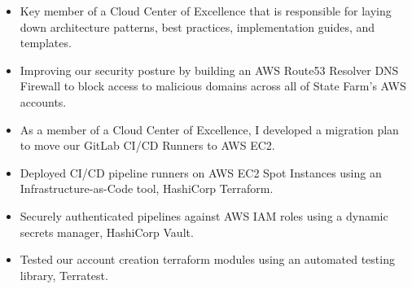\documentclass[10pt,a4paper,ragged2e,withhyper]{altacv}
\begin{document}

\makecvheader

\medskip


\begin{paracol}{2}



\medskip



\begin{itemize}
\item Key member of a Cloud Center of Excellence that is responsible for laying down architecture patterns, best practices, implementation guides, and templates.
\item Improving our security posture by building an AWS Route53 Resolver DNS Firewall to block access to malicious domains across all of State Farm's AWS accounts.
\end{itemize}

\divider


\begin{itemize}
\item As a member of a Cloud Center of Excellence, I developed a migration plan to move our GitLab CI/CD Runners to AWS EC2.
\item Deployed CI/CD pipeline runners on AWS EC2 Spot Instances using an Infrastructure-as-Code tool, HashiCorp Terraform.
\item Securely authenticated pipelines against AWS IAM roles using a dynamic secrets manager, HashiCorp Vault.
\item Tested our account creation terraform modules using an automated testing library, Terratest.
\end{itemize}

\divider



\end{paracol}
\end{document}
